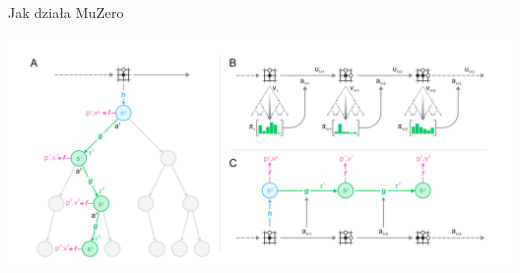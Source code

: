 \begin{frame}{Jak działa MuZero}
  \begin{center}
    \includegraphics[height=.75\textheight,keepaspectratio]{images/MuZero.png}
  \end{center}
\end{frame}